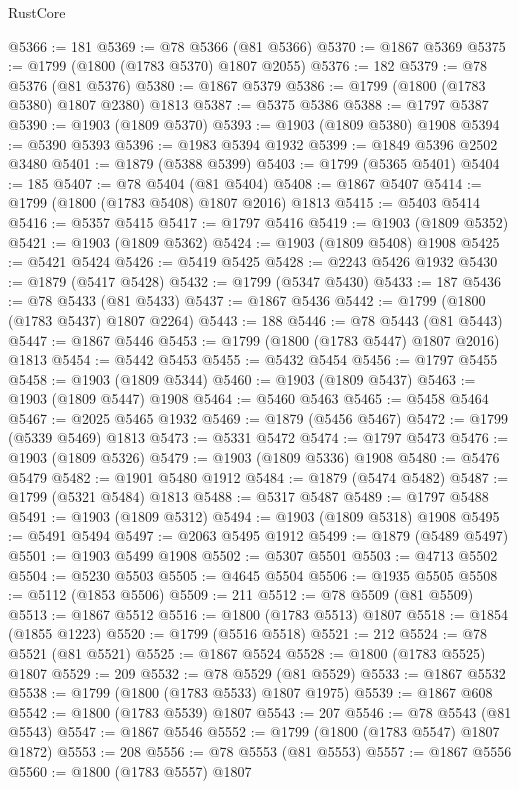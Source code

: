 \begin{lexlean}{RustCore}
\begin{coremodule}
@5366 := 181
@5369 := @78 @5366 (@81 @5366)
@5370 := @1867 @5369
@5375 := @1799 (@1800 (@1783 @5370) @1807 @2055)
@5376 := 182
@5379 := @78 @5376 (@81 @5376)
@5380 := @1867 @5379
@5386 := @1799 (@1800 (@1783 @5380) @1807 @2380) @1813
@5387 := @5375 @5386
@5388 := @1797 @5387
@5390 := @1903 (@1809 @5370)
@5393 := @1903 (@1809 @5380) @1908
@5394 := @5390 @5393
@5396 := @1983 @5394 @1932
@5399 := @1849 @5396 @2502 @3480
@5401 := @1879 (@5388 @5399)
@5403 := @1799 (@5365 @5401)
@5404 := 185
@5407 := @78 @5404 (@81 @5404)
@5408 := @1867 @5407
@5414 := @1799 (@1800 (@1783 @5408) @1807 @2016) @1813
@5415 := @5403 @5414
@5416 := @5357 @5415
@5417 := @1797 @5416
@5419 := @1903 (@1809 @5352)
@5421 := @1903 (@1809 @5362)
@5424 := @1903 (@1809 @5408) @1908
@5425 := @5421 @5424
@5426 := @5419 @5425
@5428 := @2243 @5426 @1932
@5430 := @1879 (@5417 @5428)
@5432 := @1799 (@5347 @5430)
@5433 := 187
@5436 := @78 @5433 (@81 @5433)
@5437 := @1867 @5436
@5442 := @1799 (@1800 (@1783 @5437) @1807 @2264)
@5443 := 188
@5446 := @78 @5443 (@81 @5443)
@5447 := @1867 @5446
@5453 := @1799 (@1800 (@1783 @5447) @1807 @2016) @1813
@5454 := @5442 @5453
@5455 := @5432 @5454
@5456 := @1797 @5455
@5458 := @1903 (@1809 @5344)
@5460 := @1903 (@1809 @5437)
@5463 := @1903 (@1809 @5447) @1908
@5464 := @5460 @5463
@5465 := @5458 @5464
@5467 := @2025 @5465 @1932
@5469 := @1879 (@5456 @5467)
@5472 := @1799 (@5339 @5469) @1813
@5473 := @5331 @5472
@5474 := @1797 @5473
@5476 := @1903 (@1809 @5326)
@5479 := @1903 (@1809 @5336) @1908
@5480 := @5476 @5479
@5482 := @1901 @5480 @1912
@5484 := @1879 (@5474 @5482)
@5487 := @1799 (@5321 @5484) @1813
@5488 := @5317 @5487
@5489 := @1797 @5488
@5491 := @1903 (@1809 @5312)
@5494 := @1903 (@1809 @5318) @1908
@5495 := @5491 @5494
@5497 := @2063 @5495 @1912
@5499 := @1879 (@5489 @5497)
@5501 := @1903 @5499 @1908
@5502 := @5307 @5501
@5503 := @4713 @5502
@5504 := @5230 @5503
@5505 := @4645 @5504
@5506 := @1935 @5505
@5508 := @5112 (@1853 @5506)
@5509 := 211
@5512 := @78 @5509 (@81 @5509)
@5513 := @1867 @5512
@5516 := @1800 (@1783 @5513) @1807
@5518 := @1854 (@1855 @1223)
@5520 := @1799 (@5516 @5518)
@5521 := 212
@5524 := @78 @5521 (@81 @5521)
@5525 := @1867 @5524
@5528 := @1800 (@1783 @5525) @1807
@5529 := 209
@5532 := @78 @5529 (@81 @5529)
@5533 := @1867 @5532
@5538 := @1799 (@1800 (@1783 @5533) @1807 @1975)
@5539 := @1867 @608
@5542 := @1800 (@1783 @5539) @1807
@5543 := 207
@5546 := @78 @5543 (@81 @5543)
@5547 := @1867 @5546
@5552 := @1799 (@1800 (@1783 @5547) @1807 @1872)
@5553 := 208
@5556 := @78 @5553 (@81 @5553)
@5557 := @1867 @5556
@5560 := @1800 (@1783 @5557) @1807

\end{coremodule}
\end{lexlean}

